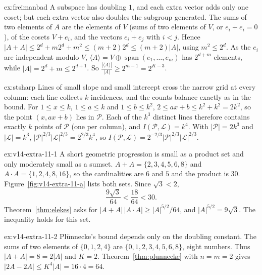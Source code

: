 \begin{solution}{ex:freimanbad}
\idea A subspace has doubling $1$, and each extra vector adds only one coset; but each extra vector also doubles the subgroup generated.
\writeup The sums of two elements of $A$ are the elements of $V$ (sums of two elements of $V$, or $e_i+e_i=0$), of the cosets $V+e_i$, and the vectors $e_i+e_j$ with $i<j$. Hence $|A+A|\le2^d+m2^d+m^2\le(m+2)2^d\le(m+2)|A|$, using $m^2\le2^d$. As the $e_i$ are independent modulo $V$, $\langle A\rangle=V\oplus\operatorname{span}(e_1,\dots,e_m)$ has $2^{d+m}$ elements, while $|A|=2^d+m\le2^{d+1}$. So $\frac{|\langle A\rangle|}{|A|}\ge2^{m-1}=2^{K-3}$.
\end{solution}

\begin{solution}{ex:stsharp}
\idea Lines of small slope and small intercept cross the narrow grid at every column: each line collects $k$ incidences, and the counts balance exactly as in the bound.
\writeup For $1\le x\le k$, $1\le a\le k$ and $1\le b\le k^2$, $2\le ax+b\le k^2+k^2=2k^2$, so the point $(x,ax+b)$ lies in $\mathcal P$. Each of the $k^3$ distinct lines therefore contains exactly $k$ points of $\mathcal P$ (one per column), and $I(\mathcal P,\mathcal L)=k^4$. With $|\mathcal P|=2k^3$ and $|\mathcal L|=k^3$, $|\mathcal P|^{2/3}|\mathcal L|^{2/3}=2^{2/3}k^4$, so $I(\mathcal P,\mathcal L)=2^{-2/3}|\mathcal P|^{2/3}|\mathcal L|^{2/3}$.
\end{solution}

\begin{solution}{ex:v14-extra-11-1}
\idea A short geometric progression is small as a product set and only moderately small as a sumset.
\writeup $A+A=\{2,3,4,5,6,8\}$ and $A\cdot A=\{1,2,4,8,16\}$, so the cardinalities are $6$ and $5$ and the product is $30$. Figure~\ref{fig:v14-extra-11-a} lists both sets. Since $\sqrt3<2$,
\[
\frac{9\sqrt3}{64}<\frac{18}{64}<30.
\]
Theorem~\ref{thm:elekes} asks for $|A+A|\,|A\cdot A|\ge|A|^{5/2}/64$, and $|A|^{5/2}=9\sqrt3$. The inequality holds for this set.
\end{solution}

\begin{solution}{ex:v14-extra-11-2}
\idea Plünnecke's bound depends only on the doubling constant.
\writeup The sums of two elements of $\{0,1,2,4\}$ are $\{0,1,2,3,4,5,6,8\}$, eight numbers. Thus $|A+A|=8=2|A|$ and $K=2$. Theorem~\ref{thm:plunnecke} with $n=m=2$ gives $|2A-2A|\le K^{4}|A|=16\cdot4=64$.
\end{solution}


